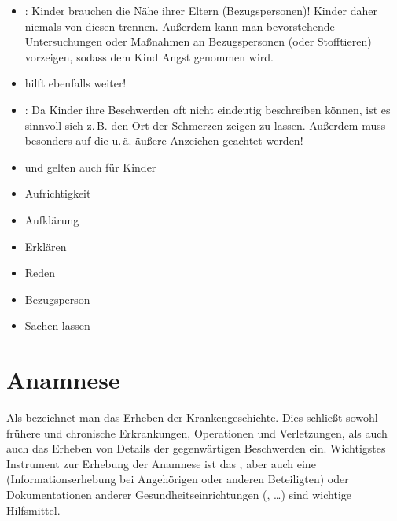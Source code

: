 {\begin{itemize}
  \item {}: Kinder brauchen die Nähe ihrer Eltern
  (Bezugspersonen)! Kinder daher niemals von diesen trennen. Außerdem kann man
  bevorstehende Untersuchungen oder Maßnahmen an Bezugspersonen (oder
  Stofftieren) vorzeigen, sodass dem Kind Angst genommen wird.
  \item {} hilft ebenfalls weiter!
  \item {}: Da Kinder ihre Beschwerden oft nicht
  eindeutig beschreiben können, ist es sinnvoll sich z.\,B. den
  Ort der Schmerzen zeigen zu lassen. Außerdem muss besonders auf die
   u.\,ä.
  äußere Anzeichen geachtet werden!
\end{itemize}
}{
\begin{itemize}
  \item {} und  gelten auch
  für Kinder
  \item Aufrichtigkeit
  \item Aufklärung
  \item Erklären
  \item Reden
  \item Bezugsperson
  \item Sachen  lassen
\end{itemize}
}{}{}{}



\section{Anamnese}


Als  bezeichnet man das Erheben der
Krankengeschichte. Dies schließt sowohl frühere und
chronische Erkrankungen, Operationen und Verletzungen, als
auch auch das Erheben von Details der gegenwärtigen Beschwerden ein. 
Wichtigstes
Instrument zur Erhebung der Anamnese ist das
, aber auch eine 
(Informationserhebung bei Angehörigen oder anderen
Beteiligten) oder Dokumentationen anderer
Gesundheitseinrichtungen (, \ldots) sind
wichtige Hilfsmittel.



